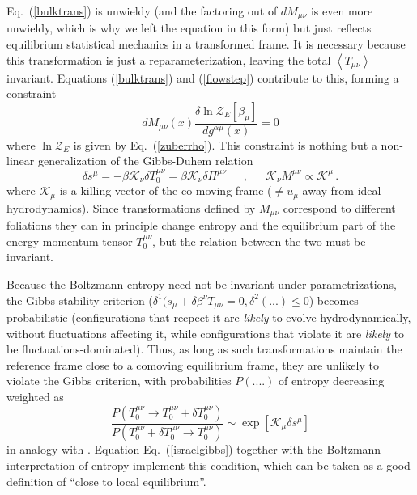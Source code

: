\documentclass[12pt,onecolumn,showpacs,amssymb,aps,nofootinbib,floatfix]{revtex4-2}
\newcommand{\ave}[1]{\left\langle #1 \right\rangle}
\renewcommand{\eqref}[1]{Eq.~(\ref{#1})}
\newcommand{\eqcomma}{\phantom{AA},\phantom{AA}}
\newcommand{\lnz}{\ln \mathcal{Z}}
\newcommand{\masoud}{}
\begin{document}
	\eqref{bulktrans} is unwieldy (and the factoring out of $dM_{\mu\nu}$ is even more unwieldy, which is why we left the equation in this form) but just reflects equilibrium statistical mechanics in a transformed frame.  It is necessary because this transformation is just a reparameterization, leaving the total $\ave{T_{\mu \nu}}$ invariant. Equations (\ref{bulktrans}) and (\ref{flowstep}) contribute to this, forming a constraint
	\begin{equation}
		\label{avconst}
		dM_{\mu \nu}(x) \frac{\delta \lnz_E[\beta_\mu]}{d g^{\alpha \mu}(x)}=0 
	\end{equation}
	where $\lnz_E$ is given by \eqref{zuberrho}. This constraint is nothing but a non-linear generalization of the Gibbs-Duhem relation \cite{Israel2009,IsraelStewart,gavagibbs}
	\begin{equation}
		\label{israelgibbs}
		\delta s^\mu = - \beta \mathcal{K}_\nu \delta T_0^{\mu \nu} = \beta \mathcal{K}_\nu \delta \Pi^{\mu \nu} \eqcomma \mathcal{K}_\nu M^{\mu \nu} \propto \mathcal{K}^\mu\,.
	\end{equation}
	where $\mathcal{K}_\mu$ is a killing vector of the co-moving frame ($\ne u_\mu$ away from ideal hydrodynamics).
	Since transformations defined by $M_{\mu \nu}$ correspond to different foliations they can in principle change entropy and the equilibrium part of the energy-momentum tensor $T_0^{\mu \nu}$, but the relation between the two must be invariant. 
	
	Because the Boltzmann entropy need not be invariant under parametrizations, the Gibbs stability criterion \cite{Israel2009} ($\delta^1 (s_\mu+ \delta \beta^\nu T_{\mu \nu}=0,\delta^2(...)\leq 0$) becomes probabilistic (configurations that recpect it are {\em likely} to evolve hydrodynamically, without fluctuations affecting it, while configurations that violate it are {\em likely} to be fluctuations-dominated).
	Thus, as long as such transformations maintain the reference frame close to a comoving equilibrium frame, they are unlikely to violate the Gibbs criterion, with probabilities $P(....)$ of entropy decreasing weighted as 
	\begin{equation}
		\label{crooks}
		\frac{P\left( T_0^{\mu \nu}\rightarrow T_0^{\mu \nu}+\delta T_0^{\mu \nu} \right)}{P\left(  T_0^{\mu \nu}+\delta T_0^{\mu \nu} \rightarrow  T_0^{\mu \nu}\right)}
		\sim \exp\left[ \mathcal{K}_\mu \delta s^\mu \right] 
	\end{equation}
	in analogy with \cite{crooks}.
	Equation \eqref{israelgibbs} together with the Boltzmann interpretation of entropy implement this condition, which can be taken as a good definition of ``close to local equilibrium''.
	
\end{document}
